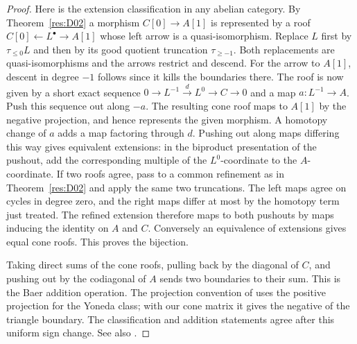 \begin{proof}
Here is the extension classification in any abelian category.
By Theorem~\ref{res:D02} a morphism \(C[0]\to A[1]\) is represented
by a roof \(C[0]\leftarrow L^\bullet\to A[1]\) whose left arrow is
a quasi-isomorphism. Replace \(L\) first by \(\tau_{\le0}L\) and then by
its good quotient truncation \(\tau_{\ge-1}\). Both replacements
are quasi-isomorphisms and the arrows restrict and descend. For the
arrow to \(A[1]\), descent in degree \(-1\) follows since it kills
the boundaries there. The roof is now given by a short exact sequence
\(0\to L^{-1}\xrightarrow{d}L^0\to C\to0\) and a map \(a:L^{-1}\to A\).
Push this sequence out along \(-a\). The resulting cone roof maps
to \(A[1]\) by the negative projection, and hence represents the
given morphism. A homotopy change of \(a\) adds a map factoring
through \(d\). Pushing out along maps differing this way gives
equivalent extensions: in the biproduct presentation of the pushout,
add the corresponding multiple of the \(L^0\)-coordinate to the
\(A\)-coordinate. If two roofs agree, pass to a common refinement
as in Theorem~\ref{res:D02} and apply the same two truncations.
The left maps agree on cycles in degree zero, and the right maps
differ at most by the homotopy term just treated. The refined
extension therefore maps to both pushouts by maps inducing the
identity on \(A\) and \(C\). Conversely an equivalence of extensions
gives equal cone roofs. This proves the bijection.

Taking direct sums of the cone roofs, pulling back by the diagonal
of \(C\), and pushing out by the codiagonal of \(A\) sends two
boundaries to their sum. This is the Baer addition operation.
The projection convention of \cite[Tags 06XP, 06XU, 06XV]{stacks-derived}
uses the positive projection for the Yoneda class; with our cone
matrix it gives the negative of the triangle boundary. The
classification and addition statements agree after this uniform
sign change. See also \cite[Chapter 11]{p103}.
\end{proof}

